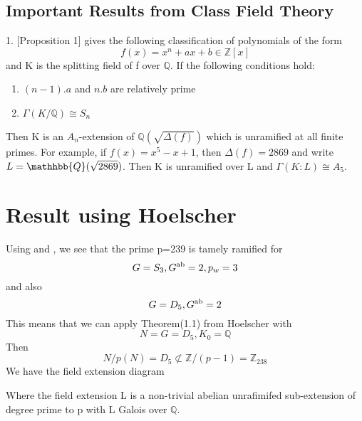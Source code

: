 \documentclass[preprint,12pt,reqno]{elsarticle}
\newcommand{\lb}{\left(}
\newcommand{\rb}{\right)}
\begin{document}
\subsection{Important Results from Class Field Theory}
1. \cite{YAMA}[Proposition 1] gives the following classification of polynomials of the form 
\begin{equation}
    f(x) = x^n+ax+b \in \mathbb{Z}[x]
\end{equation}and K is the splitting field of f over $\mathbb{Q}$.
If the following conditions hold:
\begin{enumerate}
    \item $(n-1).a$ and $n.b$ are relatively prime 
    \item $\Gamma(K/\mathbb{Q}) \cong S_n$
\end{enumerate}\par
Then K is an $A_n$-extension of $\mathbb{Q}\lb\sqrt{\Delta(f)}\rb$ which is unramified at all finite primes. For example, if $f(x) = x^5-x+1$, then $\Delta(f)= 2869$ and write $L = \mathhbb{Q}(\sqrt{2869})$. Then K is unramified over L and $\Gamma(K:L)\cong A_5.$

\section{Result using Hoelscher}

Using \cite{HOEL} and \cite{JONE}, we see that 
the prime p=239 is tamely ramified for 
\begin{equation}
  G=S_3,G\textsuperscript{ab} = 2, p_w =3  
\end{equation} and also 
\begin{equation}
    G=D_5,G\textsuperscript{ab} = 2 
\end{equation}
This means that we can apply Theorem(1.1) from Hoelscher with
\begin{equation}
    N = G = D_5, K_0 = \mathbb{Q}
\end{equation}
Then 
\begin{equation}
N/p(N) = D_5 \not\subset \mathbb{Z}/(p-1) = \mathbb{Z}_{238}
\end{equation}
We have the field extension diagram
\begin{center}
    
\end{center}
\par
Where the field extension L is a non-trivial abelian unrafimifed sub-extension of degree prime to p with L Galois over $\mathbb{Q}$.
\end{document}
